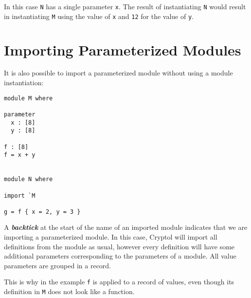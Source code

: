 In this case \texttt{N} has a single parameter \texttt{x}. The result of
instantiating \texttt{N} would result in instantiating \texttt{M} using
the value of \texttt{x} and \texttt{12} for the value of \texttt{y}.

\hypertarget{importing-parameterized-modules}{%
\section{Importing Parameterized
Modules}\label{importing-parameterized-modules}}

It is also possible to import a parameterized module without using a
module instantiation:

\begin{verbatim}
module M where

parameter
  x : [8]
  y : [8]

f : [8]
f = x + y


module N where

import `M

g = f { x = 2, y = 3 }
\end{verbatim}

A \textbf{\emph{backtick}} at the start of the name of an imported
module indicates that we are importing a parameterized module. In this
case, Cryptol will import all definitions from the module as usual,
however every definition will have some additional parameters
corresponding to the parameters of a module. All value parameters are
grouped in a record.

This is why in the example \texttt{f} is applied to a record of values,
even though its definition in \texttt{M} does not look like a function.
